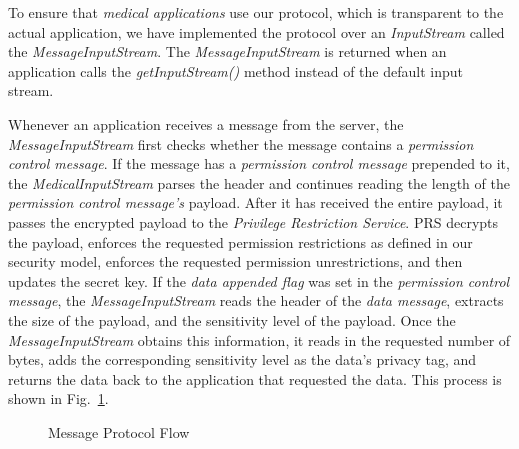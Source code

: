 To ensure that \textit{medical applications} use our protocol, which
is transparent to the actual application, we have implemented
the protocol over an \textit{InputStream} called the
\textit{MessageInputStream}.  The
\textit{MessageInputStream} is returned when an application calls 
the \textit{getInputStream()} method instead of the default input stream.

Whenever an application receives a message from the server, the
\textit{MessageInputStream} first checks whether the message
contains a \textit{permission control message}.  If the message has a
\textit{permission control message} prepended to it, the
\textit{MedicalInputStream} parses the header and continues
reading the length of the \textit{permission control message's} payload.
After it has received the entire payload, it passes the encrypted payload
to the \textit{Privilege Restriction Service}.  PRS decrypts the
payload, enforces the requested permission restrictions as defined in
our security model, enforces the requested permission unrestrictions,
and then updates the secret key. If the \textit{data appended flag}
was set in the \textit{permission control message}, 
the \textit{MessageInputStream} reads the header of the \textit{data message},
extracts the size of the payload, and the sensitivity level of the payload.
Once the \textit{MessageInputStream} obtains this information, it reads in
the requested number of bytes, adds the corresponding sensitivity level
as the data's privacy tag, and returns the data back to the application
that requested the data.  This process is shown in
Fig.~\ref{fig:frameworkcomponents}. 

\begin{figure}[ht]
\centering
{}
\caption{Message Protocol Flow}
\label{fig:frameworkcomponents}
\end{figure}


